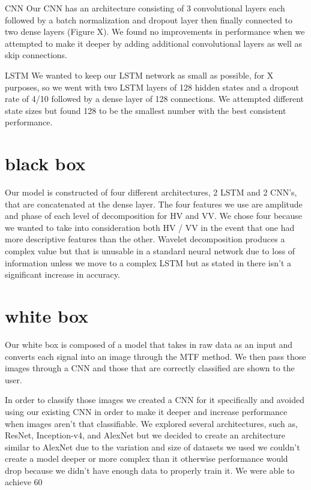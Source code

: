 \documentclass{turabian-thesis}
\begin{document}
CNN
Our CNN has an architecture consisting of 3 convolutional layers each followed by a batch normalization and dropout layer then finally connected to two dense layers (Figure X). We found no improvements in performance when we attempted to make it deeper by adding additional convolutional layers as well as skip connections.  

LSTM
We wanted to keep our LSTM network as small as possible, for X purposes, so we went with two LSTM layers of 128 hidden states and a dropout rate of 4/10  followed by a dense layer of 128 connections. We attempted different state sizes but found 128 to be the smallest number with the best consistent performance.


\section{black box}
Our model is constructed of four different architectures, 2 LSTM and 2 CNN’s, that are concatenated at the dense layer. The four features we use are amplitude and phase of each level of decomposition for HV and VV. We chose four because we wanted to take into consideration both HV / VV in the event that one had more descriptive features than the other. Wavelet decomposition produces a complex value but that is unusable in a standard neural network due to loss of information unless we move to a complex LSTM but as stated in {} there isn’t a significant increase in accuracy. 

\section{white box}
Our white box is composed of a model that takes in raw data as an input and converts each signal into an image through the MTF method. We then pass those images through a CNN and those that are correctly classified are shown to the user.

In order to classify those images we created a CNN for it specifically and avoided using our existing CNN in order to make it deeper and increase performance when images aren’t that classifiable. We explored several architectures, such as, ResNet, Inception-v4, and AlexNet but we decided to create an architecture similar to AlexNet due to the variation and size of datasets we used we couldn’t create a model deeper or more complex than it otherwise performance would drop because we didn’t have enough data to properly train it. We were able to achieve 60%
\end{document}
